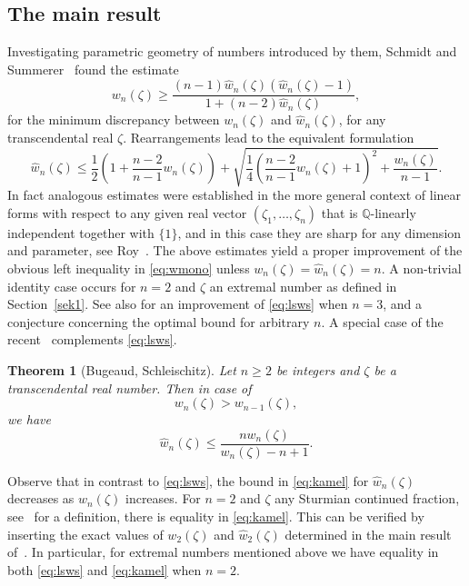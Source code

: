 \documentclass[12pt]{amsart}
\newtheorem{theorem}{Theorem}[section]
\theoremstyle{definition}
\begin{document}
\subsection{The main result}
Investigating parametric geometry of numbers introduced by them,
Schmidt and Summerer~\cite{ssch} found the estimate 
\[
w_{n}(\zeta)\geq \frac{(n-1)\widehat{w}_{n}(\zeta)(\widehat{w}_{n}(\zeta)-1)}{1+(n-2)\widehat{w}_{n}(\zeta)},
\]
for the minimum discrepancy 
between $w_{n}(\zeta)$ and $\widehat{w}_{n}(\zeta)$, for any transcendental real $\zeta$. Rearrangements lead 
to the equivalent formulation
\begin{equation} \label{eq:lsws}
\widehat{w}_{n}(\zeta)\leq 
\frac{1}{2}\left(1+\frac{n-2}{n-1}w_{n}(\zeta)\right)+
\sqrt{\frac{1}{4}\left(\frac{n-2}{n-1}w_{n}(\zeta)+1\right)^{2}+\frac{w_{n}(\zeta)}{n-1}}.
\end{equation}
In fact analogous estimates were established in the more general context of linear forms with respect to any given
real vector $(\zeta_{1},\ldots,\zeta_{n})$ that is $\mathbb{Q}$-linearly independent together with $\{1\}$,
and in this case they are sharp for any dimension and parameter, see Roy~\cite{roy}.  
The above estimates yield a proper 
improvement of the obvious left inequality in \eqref{eq:wmono}
unless $w_{n}(\zeta)=\widehat{w}_{n}(\zeta)=n$. A non-trivial identity case occurs for $n=2$ and
$\zeta$ an extremal number as defined in Section~\ref{sek1}.
See also \cite{sums} for an improvement of \eqref{eq:lsws} when $n=3$, and a conjecture
concerning the optimal bound for arbitrary $n$.
A special case of the recent~\cite[Theorem~2.2]{buschl} complements \eqref{eq:lsws}.

\begin{theorem}    [Bugeaud, Schleischitz] \label{bugsch}
Let $n\geq 2$ be integers and $\zeta$ be a transcendental real number. Then in case of
\begin{equation} \label{eq:brack}
w_{n}(\zeta)> w_{n-1}(\zeta),
\end{equation}
we have
\begin{equation} \label{eq:kamel} 
\widehat{w}_{n}(\zeta)\leq \frac{nw_{n}(\zeta)}{w_{n}(\zeta)-n+1}.
\end{equation} 
\end{theorem}

Observe that in contrast to \eqref{eq:lsws}, the bound in \eqref{eq:kamel} for $\widehat{w}_{n}(\zeta)$ decreases
as $w_{n}(\zeta)$ increases. 
For $n=2$ and $\zeta$ any Sturmian continued fraction, see~\cite{buglau} for a definition, 
there is equality in \eqref{eq:kamel}. This can be verified by inserting the 
exact values of $w_{2}(\zeta)$ and $\widehat{w}_{2}(\zeta)$
determined in the main result of~\cite{buglau}. In particular, for extremal numbers mentioned above
we have equality in both \eqref{eq:lsws} and \eqref{eq:kamel} when $n=2$.
\end{document}
